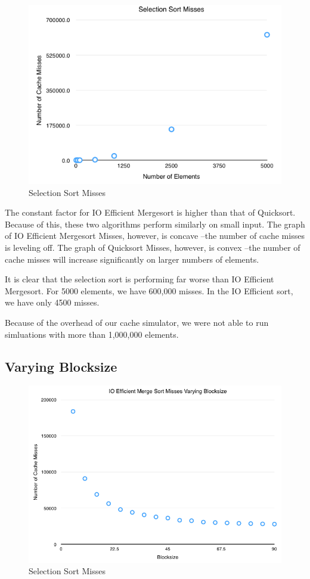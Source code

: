 \documentclass[11pt]{article}
\begin{document}
\begin{figure}[H]  
\includegraphics[scale=0.6]{figures/SelectionSortMisses.png}
\caption{Selection Sort Misses}
\label{listrankingio}
\end{figure}

The constant factor for IO Efficient Mergesort is higher than that of Quicksort. Because of this, these two algorithms perform similarly on small input. The graph of IO Efficient Mergesort Misses, however, is concave --the number of cache misses is leveling off. The graph of Quicksort Misses, however, is convex --the number of cache misses will increase significantly on larger numbers of elements.

It is clear that the selection sort is performing far worse than IO Efficient Mergesort. For 5000 elements, we have 600,000 misses. In the IO Efficient sort, we have only 4500 misses.

Because of the overhead of our cache simulator, we were not able to run simluations with more than 1,000,000 elements.

\subsection{Varying Blocksize}

\begin{figure}[H]  
\includegraphics[scale=0.45]{figures/Blocksize_IOEfficientMergeSort.png}
\caption{Selection Sort Misses}
\label{listrankingio}
\end{figure}
\end{document}
